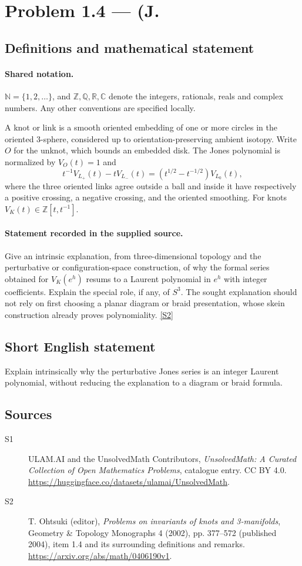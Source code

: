 \documentclass[11pt]{article}
\newcommand{\sref}[2]{\hyperlink{source:#1:#2}{[S#2]}}
\begin{document}
\section{Problem 1.4 — (J.}\label{statement}

\subsection{Definitions and mathematical statement}

\paragraph{Shared notation.}$\mathbb N=\{1,2,\ldots\}$, and $\mathbb Z,\mathbb Q,\mathbb R,\mathbb C$ denote the integers, rationals, reals and complex numbers. Any other conventions are specified locally.


A knot or link is a smooth oriented embedding of one or more circles in the oriented $3$-sphere, considered up to orientation-preserving ambient isotopy. Write $O$ for the unknot, which bounds an embedded disk. The Jones polynomial is normalized by $V_O(t)=1$ and
\[t^{-1}V_{L_+}(t)-tV_{L_-}(t)=(t^{1/2}-t^{-1/2})V_{L_0}(t),\]
where the three oriented links agree outside a ball and inside it have respectively a positive crossing, a negative crossing, and the oriented smoothing. For knots $V_K(t)\in\mathbb Z[t,t^{-1}]$.
\paragraph{Statement recorded in the supplied source.}
Give an intrinsic explanation, from three-dimensional topology and the perturbative or configuration-space construction, of why the formal series obtained for $V_K(e^h)$ resums to a Laurent polynomial in $e^h$ with integer coefficients. Explain the special role, if any, of $S^3$. The sought explanation should not rely on first choosing a planar diagram or braid presentation, whose skein construction already proves polynomiality. \sref{statement}{2}
\subsection{Short English statement}
Explain intrinsically why the perturbative Jones series is an integer Laurent polynomial, without reducing the explanation to a diagram or braid formula.
\subsection{Sources}
\begin{description}
\item[\hypertarget{source:statement:1}{S1}] ULAM.AI and the UnsolvedMath Contributors, \emph{UnsolvedMath: A Curated Collection of Open Mathematics Problems}, catalogue entry. CC BY 4.0. \url{https://huggingface.co/datasets/ulamai/UnsolvedMath}.
\item[\hypertarget{source:statement:2}{S2}] T. Ohtsuki (editor), \emph{Problems on invariants of knots and 3-manifolds}, Geometry \& Topology Monographs 4 (2002), pp. 377--572 (published 2004), item 1.4 and its surrounding definitions and remarks. \url{https://arxiv.org/abs/math/0406190v1}.
\end{description}
\label{end:statement}
\end{document}
